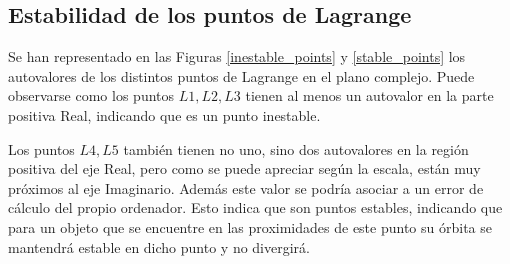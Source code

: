 \documentclass[12pt,a4paper]{article}
\begin{document}
\subsection{Estabilidad de los puntos de Lagrange} %
Se han representado en las Figuras \ref{inestable_points} y \ref{stable_points} los autovalores de los distintos puntos de Lagrange en el plano complejo. Puede observarse como los puntos ${L1, L2, L3}$ tienen al menos un autovalor en la parte positiva Real, indicando que es un punto inestable.

Los puntos ${L4, L5}$ también tienen no uno, sino dos autovalores en la región positiva del eje Real, pero como se puede apreciar según la escala, están muy próximos al eje Imaginario. Además este valor se podría asociar a un error de cálculo del propio ordenador. Esto indica que son puntos estables, indicando que para un objeto que se encuentre en las proximidades de este punto su órbita se mantendrá estable en dicho punto y no divergirá. 
\end{document}
